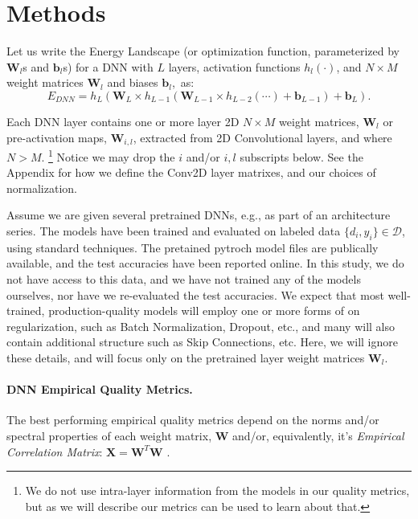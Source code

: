\section{Methods}
\label{sxn:methods}


Let us 
write the Energy Landscape (or optimization function, parameterized by $\mathbf{W}_{l}$s and $\mathbf{b}_{l}$s) for a DNN with $L$ layers, activation functions $h_{l}(\cdot)$, and $N\times M$ weight matrices $\mathbf{W}_{l}$ and biases $\mathbf{b}_{l}$,~as:
\begin{equation}
E_{DNN}=h_{L}(\mathbf{W}_{L}\times h_{L-1}(\mathbf{W}_{L-1}\times h_{L-2}(\cdots)+\mathbf{b}_{L-1})+\mathbf{b}_{L})  .
\label{eqn:dnn_energy}
\end{equation}

Each DNN layer contains one or more layer 2D  $N\times M$ weight matrices, $\mathbf{W}_{l}$ or pre-activation maps, $\mathbf{W}_{i,l}$, extracted from 2D Convolutional layers, and where $N > M$. \footnote{We do not use intra-layer information from the models in our quality metrics, but as we will describe our metrics can be used to learn about that.}
Notice we may drop the $i$ and/or $i,l$ subscripts below.
See the Appendix for how we define the Conv2D layer matrixes, and our choices of normalization. 

Assume we are given several pretrained DNNs, e.g., as part of an architecture series.
The models have been trained and evaluated on labeled data $\{d_{i},y_{i}\}\in\mathcal{D}$,
using standard techniques.  The pretained pytroch model files are publically available,
and the test accuracies have been reported online.  
In this study, we do not have access to this data, and we have not trained any of the models ourselves,
nor have we re-evaluated the test accuracies.
We expect that most well-trained, production-quality models will employ one or more forms of on regularization, such as Batch Normalization, Dropout, etc., and many will also contain additional structure such as Skip Connections, etc. 
Here, we will ignore these details, and will focus only on the pretrained layer weight matrices $\mathbf{W}_{l}$.

\paragraph{DNN Empirical Quality Metrics.}

The best performing empirical quality metrics depend on the norms and/or spectral properties of each weight matrix,
$\mathbf{W}$ and/or, equivalently, it's \emph{Empirical Correlation Matrix}: $\mathbf{X}=\mathbf{W}^{T}\mathbf{W}$ .%


